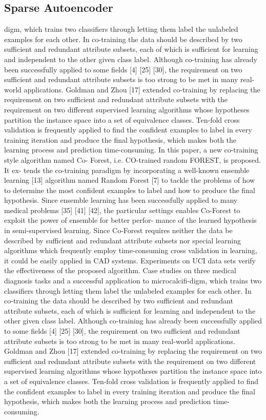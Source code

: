 \documentclass[journal]{IEEEtran}
\begin{document}
\subsection{Sparse Autoencoder}
digm, which trains two classifiers through letting them label the unlabeled examples for each other. In co-training the data should be described by two sufficient and redundant attribute subsets, each of which is sufficient for learning and independent to the other given class label.
Although co-training has already been successfully applied to some fields [4] [25] [30], the requirement on two sufficient and redundant attribute subsets is too strong to be met in many real-world applications. Goldman and Zhou [17] extended co-training by replacing the requirement on two sufficient and redundant attribute subsets with the requirement on two different supervised learning algorithms whose hypotheses partition the instance space into a set of equivalence classes. Ten-fold cross validation is frequently applied to find the confident examples to label in every training iteration and produce the final hypothesis, which makes both the learning process and prediction time-consuming.
In this paper, a new co-training style algorithm named Co- Forest, i.e. CO-trained random FOREST, is proposed. It ex- tends the co-training paradigm by incorporating a well-known ensemble learning [13] algorithm named Random Forest [7] to tackle the problems of how to determine the most confident examples to label and how to produce the final hypothesis. Since ensemble learning has been successfully applied to many medical problems [35] [41] [42], the particular settings enables Co-Forest to exploit the power of ensemble for better perfor- mance of the learned hypothesis in semi-supervised learning. Since Co-Forest requires neither the data be described by sufficient and redundant attribute subsets nor special learning algorithms which frequently employ time-consuming cross validation in learning, it could be easily applied in CAD systems. Experiments on UCI data sets verify the effectiveness of the proposed algorithm. Case studies on three medical diagnosis tasks and a successful application to microcalcifi-digm, which trains two classifiers through letting them label the unlabeled examples for each other. In co-training the data should be described by two sufficient and redundant attribute subsets, each of which is sufficient for learning and independent to the other given class label.
Although co-training has already been successfully applied to some fields [4] [25] [30], the requirement on two sufficient and redundant attribute subsets is too strong to be met in many real-world applications. Goldman and Zhou [17] extended co-training by replacing the requirement on two sufficient and redundant attribute subsets with the requirement on two different supervised learning algorithms whose hypotheses partition the instance space into a set of equivalence classes. Ten-fold cross validation is frequently applied to find the confident examples to label in every training iteration and produce the final hypothesis, which makes both the learning process and prediction time-consuming.
\end{document}
